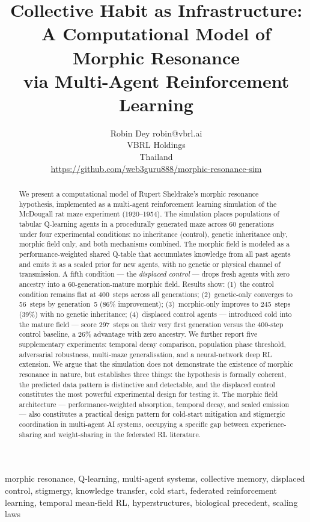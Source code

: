\documentclass[twoside,11pt]{article}
\title{Collective Habit as Infrastructure:\\
       A Computational Model of Morphic Resonance\\
       via Multi-Agent Reinforcement Learning}
\author{\name Robin Dey \email robin@vbrl.ai \\
        \addr VBRL Holdings \\
        Thailand \\
        \url{https://github.com/web3guru888/morphic-resonance-sim}}
\begin{document}
\maketitle

\begin{abstract}%
We present a computational model of Rupert Sheldrake's morphic resonance
hypothesis, implemented as a multi-agent reinforcement learning simulation of
the McDougall rat maze experiment (1920--1954).  The simulation places
populations of tabular Q-learning agents in a procedurally generated maze
across 60 generations under four experimental conditions: no inheritance
(control), genetic inheritance only, morphic field only, and both mechanisms
combined.  The morphic field is modeled as a performance-weighted shared
Q-table that accumulates knowledge from all past agents and emits it as a
scaled prior for new agents, with no genetic or physical channel of
transmission.  A fifth condition --- the \emph{displaced control} --- drops
fresh agents with zero ancestry into a 60-generation-mature morphic field.
Results show: (1)~the control condition remains flat at 400~steps across all
generations; (2)~genetic-only converges to 56~steps by generation~5 (86\%
improvement); (3)~morphic-only improves to 245~steps (39\%) with no genetic
inheritance; (4)~displaced control agents --- introduced cold into the mature
field --- score 297~steps on their very first generation versus the 400-step
control baseline, a 26\% advantage with zero ancestry.  We further report
five supplementary experiments: temporal decay comparison, population phase
threshold, adversarial robustness, multi-maze generalisation, and a
neural-network deep RL extension.  We argue that the simulation does not
demonstrate the existence of morphic resonance in nature, but establishes
three things: the hypothesis is formally coherent, the predicted data pattern
is distinctive and detectable, and the displaced control constitutes the most
powerful experimental design for testing it.  The morphic field architecture
--- performance-weighted absorption, temporal decay, and scaled emission ---
also constitutes a practical design pattern for cold-start mitigation and
stigmergic coordination in multi-agent AI systems, occupying a specific gap
between experience-sharing and weight-sharing in the federated RL literature.

\end{abstract}

\begin{keywords}
  morphic resonance, Q-learning, multi-agent systems, collective memory,
  displaced control, stigmergy, knowledge transfer, cold start,
  federated reinforcement learning, temporal mean-field RL,
  hyperstructures, biological precedent, scaling laws
\end{keywords}
\end{document}
